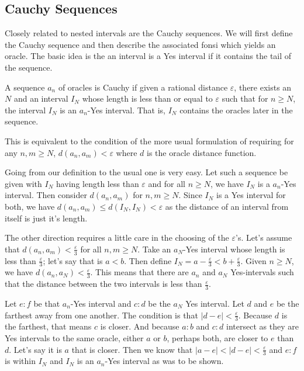 \documentclass[12pt]{article}
\theoremstyle{remark}
\begin{document}
\subsection{Cauchy Sequences}

Closely related to nested intervals are the Cauchy sequences. We will first define the Cauchy sequence and then describe the associated fonsi which yields an oracle. The basic idea is the an interval is a Yes interval if it contains the tail of the sequence. 

A sequence $a_n$ of oracles is Cauchy if given a rational distance $\varepsilon$, there exists an $N$ and an interval $I_N$ whose length is less than or equal to $\varepsilon$ such that for $n \geq N$, the interval $I_N$ is an $a_n$-Yes interval. That is, $I_N$ contains the oracles later in the sequence. 

This is equivalent to the condition of the more usual formulation of requiring for any $n, m \geq N$, $d(a_n,  a_m) < \varepsilon$ where $d$ is the oracle distance function. 

Going from our definition to the usual one is very easy. Let such a sequence be given with $I_N$ having length less than $\varepsilon$ and for all $n \geq N$, we have $I_N$ is a $a_n$-Yes interval. Then consider $d(a_n, a_m)$ for $n, m \geq N$. Since $I_N$ is a Yes interval for both, we have $d(a_n, a_m) \leq d(I_N, I_N) < \varepsilon$ as the distance of an interval from itself is just it's length. 

The other direction requires a little care in the choosing of the $\varepsilon$'s. Let's assume that $d(a_n, a_m) < \frac{\varepsilon}{3}$ for all $n, m \geq N$. Take an $a_N$-Yes interval whose length is less than $\frac{\varepsilon}{3}$; let's say that is $a \lt b$. Then define $I_N = a-\frac{\varepsilon}{3} \lt b + \frac{\varepsilon}{3}$. Given $n \geq N$, we have $d(a_n, a_N) < \frac{\varepsilon}{3}$. This means that there are $a_n$ and $a_N$ Yes-intervals such that the distance between the two intervals is less than $\frac{\varepsilon}{3}$. 

Let $e:f$ be that $a_n$-Yes interval and $c:d$ be the $a_N$ Yes interval. Let $d$ and $e$ be the farthest away from one another. The condition is that $|d-e| < \frac{\varepsilon}{3}$. Because $d$ is the farthest, that means $c$ is closer. And because $a:b$ and $c:d$ intersect as they are Yes intervals to the same oracle, either $a$ or $b$, perhaps both, are closer to $e$ than $d$. Let's say it is $a$ that is closer. Then we know that $|a-e| < |d-e| < \frac{\varepsilon}{3}$ and $e:f$ is within $I_N$ and $I_N$ is an $a_n$-Yes interval as was to be shown. 
\end{document}
